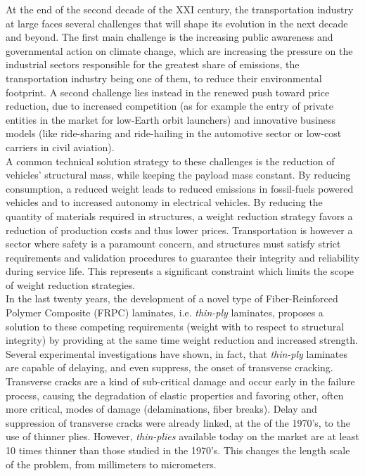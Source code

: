 At the end of the second decade of the XXI century, the transportation industry at large faces several challenges that will shape its evolution in the next decade and beyond. The first main challenge is the increasing public awareness and governmental action on climate change, which are increasing the pressure on the industrial sectors responsible for the greatest share of emissions, the transportation industry being one of them, to reduce their environmental footprint. A second challenge lies instead in the renewed push toward price reduction, due to increased competition (as for example the entry of private entities in the market for low-Earth orbit launchers) and innovative business models (like ride-sharing and ride-hailing in the automotive sector or low-cost carriers in civil aviation).\\
A common technical solution strategy to these challenges is the reduction of vehicles' structural mass, while keeping the payload mass constant. By reducing consumption, a reduced weight leads to reduced emissions in fossil-fuels powered vehicles and to increased autonomy in electrical vehicles. By reducing the quantity of materials required in structures, a weight reduction strategy favors a reduction of production costs and thus lower prices. Transportation is however a sector where safety is a paramount concern, and structures must satisfy strict requirements and validation procedures to guarantee their integrity and reliability during service life. This represents a significant constraint which limits the scope of weight reduction strategies.\\
In the last twenty years, the development of a novel type of Fiber-Reinforced Polymer Composite (FRPC) laminates, i.e. \emph{thin-ply} laminates, proposes a solution to these competing requirements (weight with to respect to structural integrity) by providing at the same time weight reduction and increased strength. Several experimental investigations have shown, in fact, that \emph{thin-ply} laminates are capable of delaying, and even suppress, the onset of transverse cracking. Transverse cracks are a kind of sub-critical damage and occur early in the failure process, causing the degradation of elastic properties and favoring other, often more critical, modes of damage (delaminations, fiber breaks). Delay and suppression of transverse cracks were already linked, at the of the 1970's, to the use of thinner plies. However, \emph{thin-plies} available today on the market are at least 10 times thinner than those studied in the 1970's. This changes the length scale of the problem, from millimeters to micrometers.   
